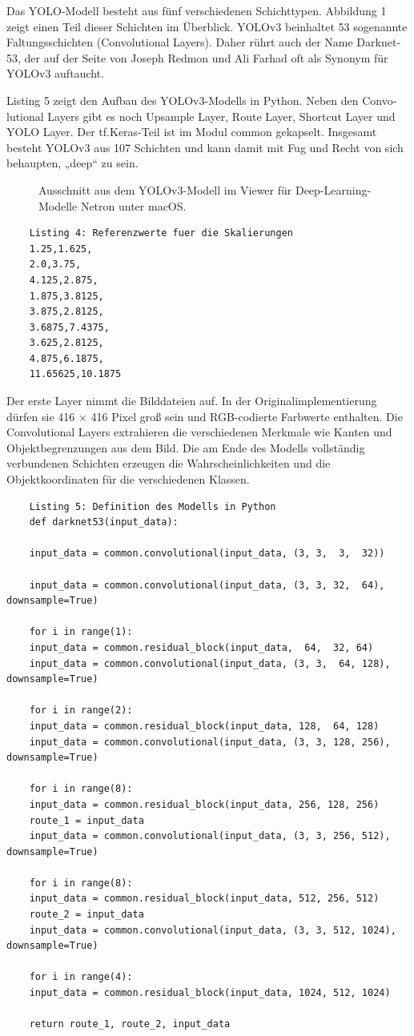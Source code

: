 Das YOLO-Modell besteht aus fünf verschiedenen Schichttypen. Abbildung 1 zeigt einen Teil dieser Schichten im Überblick. YOLOv3 beinhaltet 53 sogenannte Faltungsschichten (Convolutional Layers). Daher rührt auch der Name Darknet-53, der auf der Seite von Joseph Redmon und Ali Farhad oft als Synonym für YOLOv3 auftaucht. 

Listing 5 zeigt den Aufbau des YOLOv3-­­Modells in Python. Neben den Convo­lutional Layers gibt es noch Up­sample Layer, Route Layer, Shortcut Layer und YOLO Layer. Der tf.Keras-Teil ist im Modul common gekapselt. Insgesamt besteht YOLOv3 aus 107 Schichten und kann damit mit Fug und Recht von sich behaupten, „deep“ zu sein. 

\begin{figure}
	\caption{Ausschnitt aus dem YOLOv3-Modell im Viewer für Deep-Learning-Modelle Netron unter macOS.}
\end{figure}	

\begin{lstlisting}
    Listing 4: Referenzwerte fuer die Skalierungen
    1.25,1.625, 
	2.0,3.75, 
	4.125,2.875, 
	1.875,3.8125, 
	3.875,2.8125, 
	3.6875,7.4375, 
	3.625,2.8125, 
	4.875,6.1875, 
	11.65625,10.1875
\end{lstlisting}	

	Der erste Layer nimmt die Bilddateien auf. In der Originalimplementierung dürfen sie 416 × 416 Pixel groß sein und RGB-codierte Farbwerte enthalten. Die Convolutional Layers extrahieren die verschiedenen Merkmale wie Kanten und Objektbegrenzungen aus dem Bild. Die am Ende des Modells vollständig verbundenen Schichten erzeugen die Wahrscheinlichkeiten und die Objektkoordinaten für die verschiedenen Klassen. 

\begin{lstlisting}
	Listing 5: Definition des Modells in Python 
	def darknet53(input_data):
	
	input_data = common.convolutional(input_data, (3, 3,  3,  32))  
	
	input_data = common.convolutional(input_data, (3, 3, 32,  64), downsample=True)
	
	for i in range(1):
	input_data = common.residual_block(input_data,  64,  32, 64)
	input_data = common.convolutional(input_data, (3, 3,  64, 128), downsample=True)
	
	for i in range(2):
	input_data = common.residual_block(input_data, 128,  64, 128)
	input_data = common.convolutional(input_data, (3, 3, 128, 256), downsample=True)
	
	for i in range(8):
	input_data = common.residual_block(input_data, 256, 128, 256)
	route_1 = input_data
	input_data = common.convolutional(input_data, (3, 3, 256, 512), downsample=True)
	
	for i in range(8):
	input_data = common.residual_block(input_data, 512, 256, 512)
	route_2 = input_data
	input_data = common.convolutional(input_data, (3, 3, 512, 1024), downsample=True)
	
	for i in range(4):
	input_data = common.residual_block(input_data, 1024, 512, 1024)
	
	return route_1, route_2, input_data
\end{lstlisting}	

